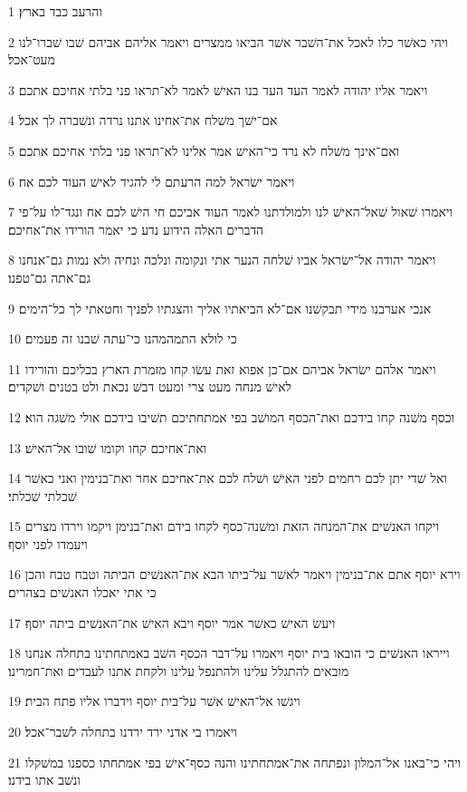 \par 1 והרעב כבד בארץ׃
\par 2 ויהי כאשׁר כלו לאכל את־השׁבר אשׁר הביאו ממצרים ויאמר אליהם אביהם שׁבו שׁברו־לנו מעט־אכל׃
\par 3 ויאמר אליו יהודה לאמר העד העד בנו האישׁ לאמר לא־תראו פני בלתי אחיכם אתכם׃
\par 4 אם־ישׁך משׁלח את־אחינו אתנו נרדה ונשׁברה לך אכל׃
\par 5 ואם־אינך משׁלח לא נרד כי־האישׁ אמר אלינו לא־תראו פני בלתי אחיכם אתכם׃
\par 6 ויאמר ישׂראל למה הרעתם לי להגיד לאישׁ העוד לכם אח׃
\par 7 ויאמרו שׁאול שׁאל־האישׁ לנו ולמולדתנו לאמר העוד אביכם חי הישׁ לכם אח ונגד־לו על־פי הדברים האלה הידוע נדע כי יאמר הורידו את־אחיכם׃
\par 8 ויאמר יהודה אל־ישׂראל אביו שׁלחה הנער אתי ונקומה ונלכה ונחיה ולא נמות גם־אנחנו גם־אתה גם־טפנו׃
\par 9 אנכי אערבנו מידי תבקשׁנו אם־לא הביאתיו אליך והצגתיו לפניך וחטאתי לך כל־הימים׃
\par 10 כי לולא התמהמהנו כי־עתה שׁבנו זה פעמים׃
\par 11 ויאמר אלהם ישׂראל אביהם אם־כן אפוא זאת עשׂו קחו מזמרת הארץ בכליכם והורידו לאישׁ מנחה מעט צרי ומעט דבשׁ נכאת ולט בטנים ושׁקדים׃
\par 12 וכסף משׁנה קחו בידכם ואת־הכסף המושׁב בפי אמתחתיכם תשׁיבו בידכם אולי משׁגה הוא׃
\par 13 ואת־אחיכם קחו וקומו שׁובו אל־האישׁ׃
\par 14 ואל שׁדי יתן לכם רחמים לפני האישׁ ושׁלח לכם את־אחיכם אחר ואת־בנימין ואני כאשׁר שׁכלתי שׁכלתי׃
\par 15 ויקחו האנשׁים את־המנחה הזאת ומשׁנה־כסף לקחו בידם ואת־בנימן ויקמו וירדו מצרים ויעמדו לפני יוסף׃
\par 16 וירא יוסף אתם את־בנימין ויאמר לאשׁר על־ביתו הבא את־האנשׁים הביתה וטבח טבח והכן כי אתי יאכלו האנשׁים בצהרים׃
\par 17 ויעשׂ האישׁ כאשׁר אמר יוסף ויבא האישׁ את־האנשׁים ביתה יוסף׃
\par 18 וייראו האנשׁים כי הובאו בית יוסף ויאמרו על־דבר הכסף השׁב באמתחתינו בתחלה אנחנו מובאים להתגלל עלינו ולהתנפל עלינו ולקחת אתנו לעבדים ואת־חמרינו׃
\par 19 ויגשׁו אל־האישׁ אשׁר על־בית יוסף וידברו אליו פתח הבית׃
\par 20 ויאמרו בי אדני ירד ירדנו בתחלה לשׁבר־אכל׃
\par 21 ויהי כי־באנו אל־המלון ונפתחה את־אמתחתינו והנה כסף־אישׁ בפי אמתחתו כספנו במשׁקלו ונשׁב אתו בידנו׃
